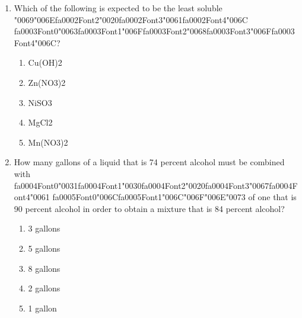 \documentclass[12pt]{article}
\begin{document}
\begin{enumerate}[label=\arabic*.]
\begin{enumerate}[label=(\alph*)]
    \item Transition metals tend to lose electrons when reacting with other elements.
    \item Transition metals all have a minimum of two unpaired electrons.
    \item Transition metals have a maximum of two unpaired electrons.
\end{enumerate}
\item Which of the following is expected to be the least soluble {\char"0069}{\char"006E}{\csname fa0002Font2\endcsname\char"0020}{\csname fa0002Font3\endcsname\char"0061}{\csname fa0002Font4\endcsname\char"006C} {\csname fa0003Font0\endcsname\char"0063}{\csname fa0003Font1\endcsname\char"006F}{\csname fa0003Font2\endcsname\char"0068}{\csname fa0003Font3\endcsname\char"006F}{\csname fa0003Font4\endcsname\char"006C}?
\begin{enumerate}[label=(\alph*)]
    \item Cu(OH)2
    \item Zn(NO3)2
    \item NiSO3
    \item MgCl2
    \item Mn(NO3)2
\end{enumerate}
\item How many gallons of a liquid that is 74 percent alcohol must be combined with {\csname fa0004Font0\endcsname\char"0031}{\csname fa0004Font1\endcsname\char"0030}{\csname fa0004Font2\endcsname\char"0020}{\csname fa0004Font3\endcsname\char"0067}{\csname fa0004Font4\endcsname\char"0061} {\csname fa0005Font0\endcsname\char"006C}{\csname fa0005Font1\endcsname\char"006C}{\char"006F}{\char"006E}{\char"0073} of
one that is 90 percent alcohol in order to obtain a mixture that is 84 percent alcohol?
\begin{enumerate}[label=(\alph*)]
    \item 3 gallons
    \item 5 gallons
    \item 8 gallons
    \item 2 gallons
    \item 1 gallon
\end{enumerate}
\end{enumerate}
\end{document}

